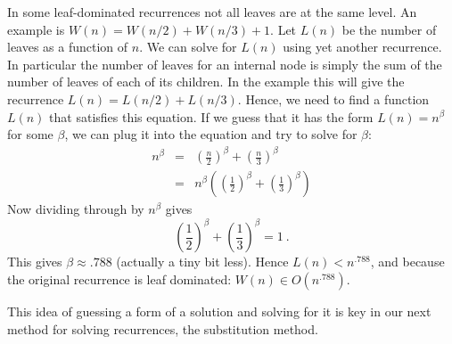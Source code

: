 \begin{gram}[Advanced]
  In some leaf-dominated recurrences 
 not all leaves are at the same level.    An example is
  $W(n) = W(n/2) + W(n/3) + 1$.
  Let $L(n)$ be the number of leaves as a function of $n$.  We can
  solve for $L(n)$ using yet another recurrence.  In particular the
  number of leaves for an internal node is simply the sum of the
  number of leaves of each of its children.  In the example this will
  give the recurrence $L(n) = L(n/2) + L(n/3)$.  Hence, we need to
  find a function $L(n)$ that satisfies this equation.  If we guess
  that it has the form $L(n) = n^{\beta}$ for some $\beta$, we can
  plug it into the equation and try to solve for $\beta$:
\[
\begin{array}{lcl}
n^{\beta} & =  &\left(\frac{n}{2}\right)^{\beta} +
                         \left(\frac{n}{3}\right)^{\beta}\\
             & =  &n^{\beta}\left(\left(\frac{1}{2}\right)^{\beta} +
                    \left(\frac{1}{3}\right)^{\beta}\right)
\end{array}
\]
Now dividing through by $n^{\beta}$ gives 
\[ \left(\frac{1}{2}\right)^{\beta} + \left(\frac{1}{3}\right)^{\beta}
= 1~.\]
This gives $\beta \approx .788$ (actually a tiny bit less).   Hence $L(n) < n^{.788}$, and
because the original recurrence is leaf dominated:
$W(n) \in O(n^{.788})$.

This idea of guessing a form of a solution and solving for it is key
in our next method for solving recurrences, the substitution method.
\end{gram}








